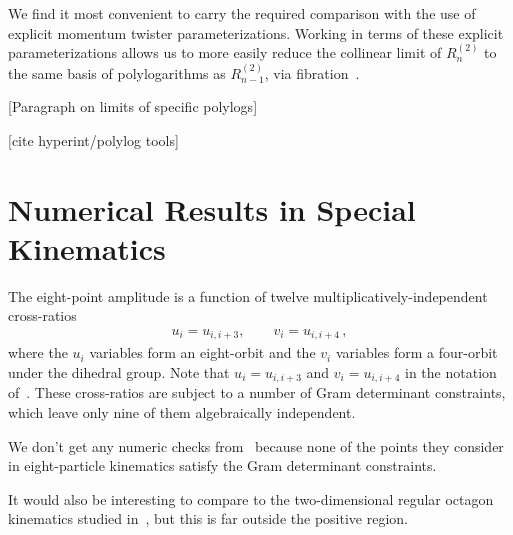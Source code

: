 \documentclass[11pt]{article}
\begin{document}
We find it most convenient to carry the required comparison with the use of explicit momentum twister parameterizations. Working in terms of these explicit parameterizations allows us to more easily reduce the collinear limit of $R_n^{(2)}$\! to the same basis of polylogarithms as $R_{n-1}^{(2)}$, via fibration~\cite{Brown:2009qja}. 

[Paragraph on limits of specific polylogs]

[cite hyperint/polylog tools]




\section{Numerical Results in Special Kinematics}

The eight-point amplitude is a function of twelve multiplicatively-independent cross-ratios
\begin{align}
u_i = u_{i,i+3}, \qquad v_i = u_{i,i+4} \, ,
\end{align}
where the $u_i$ variables form an eight-orbit and the $v_i$ variables form a four-orbit under the dihedral group. Note that $u_i = u_{i,i+3}$ and $v_i =  u_{i,i+4}$ in the notation of~\cite{Anastasiou:2009kna}. These cross-ratios are subject to a number of Gram determinant constraints, which leave only nine of them algebraically independent. 



We don't get any numeric checks from~\cite{Anastasiou:2009kna} because none of the points they consider in eight-particle kinematics satisfy the Gram determinant constraints.

It would also be interesting to compare to the two-dimensional regular octagon kinematics studied in~\cite{Alday:2009yn,Alday:2009ga}, but this is far outside the positive region.
\end{document}
